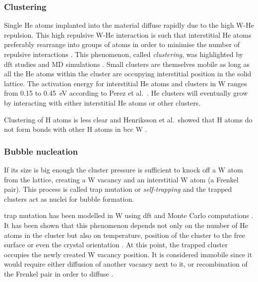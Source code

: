 \subsubsection{Clustering}
Single He atoms implanted into the material diffuse rapidly due to the high W-He repulsion.
This high repulsive W-He interaction is such that interstitial He atoms preferably rearrange into groups of atoms in order to minimise the number of repulsive interactions .
This phenomenon, called \emph{clustering}, was highlighted by \gls{dft} studies \cite{becquart_density_2009,dunn_rate_2013} and MD simulations \cite{henriksson_molecular_2006}.
Small clusters are themselves mobile as long as all the He atoms within the cluster are occupying interstitial position in the solid \gls{lattice}.
The activation energy for interstitial He atoms and clusters in \gls{W} ranges from 0.15 to \SI{0.45}{eV} according to Perez et al.\ .
He clusters will eventually grow by interacting with either interstitial He atoms or other clusters.

Clustering of \gls{H} atoms is less clear and Henriksson et al.\ showed that \gls{H} atoms do not form bonds with other \gls{H} atoms in \gls{bcc} \gls{W} .

\subsubsection{Bubble nucleation}

If its size is big enough the cluster pressure is sufficient to knock off a \gls{W} atom from the \gls{lattice}, creating a \gls{W} \gls{vacancy} and an interstitial \gls{W} atom (a \gls{Frenkel pair}).
This process is called \gls{trap mutation} or \emph{\gls{self-trapping}} and the trapped clusters act as nuclei for bubble formation.

\Gls{trap mutation} has been modelled in \gls{W} using \gls{dft}  and Monte Carlo computations .
It has been shown that this phenomenon depends not only on the number of He atoms in the cluster but also on temperature, position of the cluster to the free surface or even the crystal orientation .
At this point, the trapped cluster occupies the newly created \gls{W} \gls{vacancy} position.
It is considered immobile since it would require either diffusion of another \gls{vacancy} next to it, or recombination of the Frenkel pair in order to diffuse .

